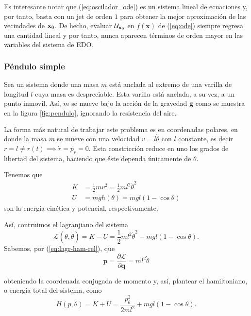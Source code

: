 Es interesante notar que (\ref{eq:oscilador_ode}) es un sistema lineal de ecuaciones y, por tanto, basta con un jet de orden $1$ para obtener la mejor aproximación de las vecindades de $\mathbf{x}_0$. De hecho, evaluar $\mathcal{U}_{\mathbf{x}_0}$ en $f(\mathbf{x})$ de (\ref{eq:ode}) siempre regresa una cantidad lineal y por tanto, nunca aparecen términos de orden mayor en las variables del sistema de EDO.

\clearpage
\subsubsection{Péndulo simple}
\label{sec:pendulo}
Sea un sistema donde una masa $m$ está anclada al extremo de una varilla de longitud $l$ cuya masa es despreciable. Esta varilla está anclada, a su vez, a un punto inmovil. Así, $m$ se mueve bajo la acción de la gravedad $\mathbf{g}$ como se muestra en la figura \ref{fig:pendulo}, ignorando la resistencia del aire.



La forma más natural de trabajar este problema es en coordenadas polares, en donde la masa $m$ se mueve con una velocidad $v = l\dot{\theta}$ con $l$ constante, es decir $r = l \neq r(t) \implies \dot{r} = \dot{p_r} = 0$. Esta constricción reduce en uno los grados de libertad del sistema, haciendo que éste dependa únicamente de $\theta$. 

Tenemos que 
\begin{align}
 K &= \frac{1}{2}m v^2 = \frac{1}{2} m l^2 \dot{\theta}^2 \nonumber \\
 U &= mgh(\theta) = mgl\left(1 - \cos{\theta} \right)
\end{align}
son la energía cinética y potencial, respectivamente. 

Así, contruimos el lagranjiano del sistema
\begin{equation*}
 \mathcal{L}(\theta,\dot{\theta}) = K - U = \frac{1}{2} m l^2 \dot{\theta}^2 - mgl\left(1 - \cos{\theta} \right).
\end{equation*}
Sabemos, por (\ref{eq:lagr-ham-rel}), que
\begin{equation*}
 \mathbf{p} = \frac{\partial \mathcal{L}}{\partial \mathbf{\dot{q}}} = ml^2\dot{\theta}
\end{equation*}

obteniendo la coordenada conjugada de momento y, así, plantear el hamiltoniano, o energía total del sistema, como
\begin{equation}
 H(p,\theta) = K + U = \frac{p_{\theta}^2}{2ml^2} + mgl\left(1 - \cos{\theta} \right).
\label{eq:pendulo-ham}
\end{equation}
 
